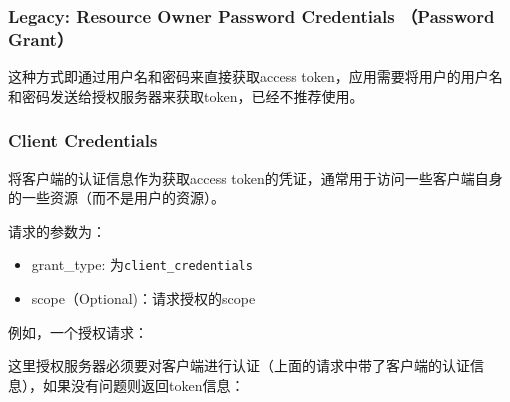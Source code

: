 \documentclass[12pt]{article}
\begin{document}
\subsubsection{Legacy: Resource Owner Password Credentials （Password Grant）}\label{legacy-resource-owner-password-credentials-password-grant}

这种方式即通过用户名和密码来直接获取access token，应用需要将用户的用户名和密码发送给授权服务器来获取token，已经不推荐使用。

\subsubsection{Client Credentials}\label{client-credentials}

将客户端的认证信息作为获取access token的凭证，通常用于访问一些客户端自身的一些资源（而不是用户的资源）。

请求的参数为：

\begin{itemize}
\tightlist
\item
  grant\_type: 为\texttt{client\_credentials}
\item
  scope（Optional)：请求授权的scope
\end{itemize}

例如，一个授权请求：

\begin{Shaded}
\begin{Highlighting}[]
 \OperatorTok{/} \OperatorTok{/}
     \OperatorTok{:} 
     \OperatorTok{:}  
     \OperatorTok{{-}}\OperatorTok{:} \OperatorTok{/}\OperatorTok{{-}}\OperatorTok{{-}}\OperatorTok{{-}}

     \OperatorTok{=}
\end{Highlighting}
\end{Shaded}

这里授权服务器必须要对客户端进行认证（上面的请求中带了客户端的认证信息），如果没有问题则返回token信息：

\begin{Shaded}
\begin{Highlighting}[]
\FunctionTok{\{}
  \FunctionTok{:}\FunctionTok{,}
  \FunctionTok{:}\FunctionTok{,}
  \FunctionTok{:}\FunctionTok{,}
  \FunctionTok{:}
\FunctionTok{\}}
\end{Highlighting}
\end{Shaded}
\end{document}
